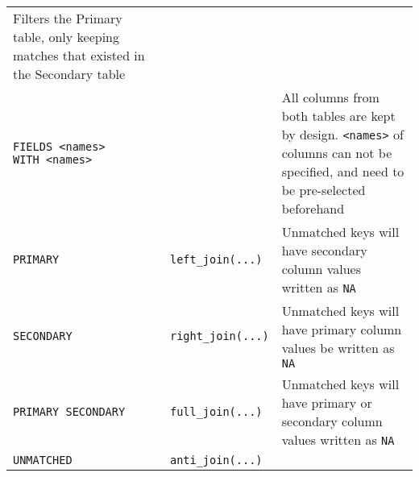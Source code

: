 \documentclass[
]{book}
\begin{document}
\begin{longtable}[]{@{}lll@{}}
\begin{minipage}[t]{0.30\columnwidth}
Filters the Primary table, only keeping matches that existed in the Secondary table\strut
\end{minipage}\tabularnewline
\begin{minipage}[t]{0.30\columnwidth}\raggedright
\texttt{FIELDS\ \textless{}names\textgreater{}} \texttt{WITH\ \textless{}names\textgreater{}}\strut
\end{minipage} & \begin{minipage}[t]{0.30\columnwidth}\raggedright
\strut
\end{minipage} & \begin{minipage}[t]{0.30\columnwidth}\raggedright
All columns from both tables are kept by design. \texttt{\textless{}names\textgreater{}} of columns can not be specified, and need to be pre-selected beforehand\strut
\end{minipage}\tabularnewline
\begin{minipage}[t]{0.30\columnwidth}\raggedright
\texttt{PRIMARY}\strut
\end{minipage} & \begin{minipage}[t]{0.30\columnwidth}\raggedright
\texttt{left\_join(...)}\strut
\end{minipage} & \begin{minipage}[t]{0.30\columnwidth}\raggedright
Unmatched keys will have secondary column values written as \texttt{NA}\strut
\end{minipage}\tabularnewline
\begin{minipage}[t]{0.30\columnwidth}\raggedright
\texttt{SECONDARY}\strut
\end{minipage} & \begin{minipage}[t]{0.30\columnwidth}\raggedright
\texttt{right\_join(...)}\strut
\end{minipage} & \begin{minipage}[t]{0.30\columnwidth}\raggedright
Unmatched keys will have primary column values be written as \texttt{NA}\strut
\end{minipage}\tabularnewline
\begin{minipage}[t]{0.30\columnwidth}\raggedright
\texttt{PRIMARY\ SECONDARY}\strut
\end{minipage} & \begin{minipage}[t]{0.30\columnwidth}\raggedright
\texttt{full\_join(...)}\strut
\end{minipage} & \begin{minipage}[t]{0.30\columnwidth}\raggedright
Unmatched keys will have primary or secondary column values written as \texttt{NA}\strut
\end{minipage}\tabularnewline
\begin{minipage}[t]{0.30\columnwidth}\raggedright
\texttt{UNMATCHED}\strut
\end{minipage} & \begin{minipage}[t]{0.30\columnwidth}\raggedright
\texttt{anti\_join(...)}\strut
\end{minipage} & \begin{minipage}[t]{0.30\columnwidth}\raggedright
\strut
\end{minipage}\tabularnewline
\bottomrule
\end{longtable}
\end{document}
